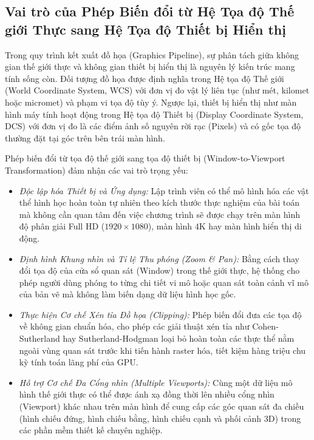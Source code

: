\subsection{Vai trò của Phép Biến đổi từ Hệ Tọa độ Thế giới Thực sang Hệ Tọa độ Thiết bị Hiển thị}
\label{subsec:world_to_display_transformation}

Trong quy trình kết xuất đồ họa (Graphics Pipeline), sự phân tách giữa không gian thế giới thực và không gian thiết bị hiển thị là nguyên lý kiến trúc mang tính sống còn. Đối tượng đồ họa được định nghĩa trong Hệ tọa độ Thế giới (World Coordinate System, WCS) với đơn vị đo vật lý liên tục (như mét, kilomet hoặc micromet) và phạm vi tọa độ tùy ý. Ngược lại, thiết bị hiển thị như màn hình máy tính hoạt động trong Hệ tọa độ Thiết bị (Display Coordinate System, DCS) với đơn vị đo là các điểm ảnh số nguyên rời rạc (Pixels) và có gốc tọa độ thường đặt tại góc trên bên trái màn hình.

Phép biến đổi từ tọa độ thế giới sang tọa độ thiết bị (Window-to-Viewport Transformation) đảm nhận các vai trò trọng yếu:
\begin{itemize}
    \item \textit{Độc lập hóa Thiết bị và Ứng dụng:} Lập trình viên có thể mô hình hóa các vật thể hình học hoàn toàn tự nhiên theo kích thước thực nghiệm của bài toán mà không cần quan tâm đến việc chương trình sẽ được chạy trên màn hình độ phân giải Full HD ($1920 \times 1080$), màn hình $4\text{K}$ hay màn hình hiển thị di động.
    \item \textit{Định hình Khung nhìn và Tỉ lệ Thu phóng (Zoom \& Pan):} Bằng cách thay đổi tọa độ của cửa sổ quan sát (Window) trong thế giới thực, hệ thống cho phép người dùng phóng to từng chi tiết vi mô hoặc quan sát toàn cảnh vĩ mô của bản vẽ mà không làm biến dạng dữ liệu hình học gốc.
    \item \textit{Thực hiện Cơ chế Xén tỉa Đồ họa (Clipping):} Phép biến đổi đưa các tọa độ về không gian chuẩn hóa, cho phép các giải thuật xén tỉa như Cohen-Sutherland hay Sutherland-Hodgman loại bỏ hoàn toàn các thực thể nằm ngoài vùng quan sát trước khi tiến hành raster hóa, tiết kiệm hàng triệu chu kỳ tính toán lãng phí của GPU.
    \item \textit{Hỗ trợ Cơ chế Đa Cổng nhìn (Multiple Viewports):} Cùng một dữ liệu mô hình thế giới thực có thể được ánh xạ đồng thời lên nhiều cổng nhìn (Viewport) khác nhau trên màn hình để cung cấp các góc quan sát đa chiều (hình chiếu đứng, hình chiếu bằng, hình chiếu cạnh và phối cảnh 3D) trong các phần mềm thiết kế chuyên nghiệp.
\end{itemize}

